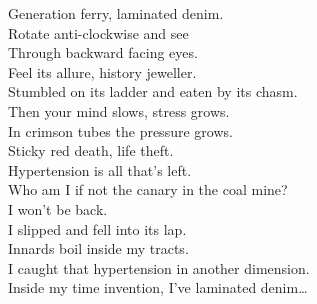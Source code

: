 Generation ferry, laminated denim. \\
Rotate anti-clockwise and see \\
Through backward facing eyes. \\
Feel its allure, history jeweller. \\
Stumbled on its ladder and eaten by its chasm. \\

Then your mind slows, stress grows. \\
In crimson tubes the pressure grows. \\
Sticky red death, life theft. \\
Hypertension is all that's left. \\

Who am I if not the canary in the coal mine? \\
I won't be back. \\
I slipped and fell into its lap. \\
Innards boil inside my tracts. \\

I caught that hypertension in another dimension. \\
Inside my time invention, I've laminated denim… \\
